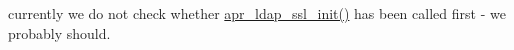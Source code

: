 
\begin{DoxyRefList}
\item[\label{todo__todo000001}%
\hypertarget{todo__todo000001}{}%
Global \hyperlink{group___a_p_r___util___l_d_a_p_ga4425baf721f1857e0d8e066076aa595c}{apr\-\_\-ldap\-\_\-ssl\-\_\-deinit} (void)]currently we do not check whether \hyperlink{group___a_p_r___util___l_d_a_p_ga8530e90ca597f822a571b6813021e1f1}{apr\-\_\-ldap\-\_\-ssl\-\_\-init()} has been called first -\/ we probably should. 
\end{DoxyRefList}